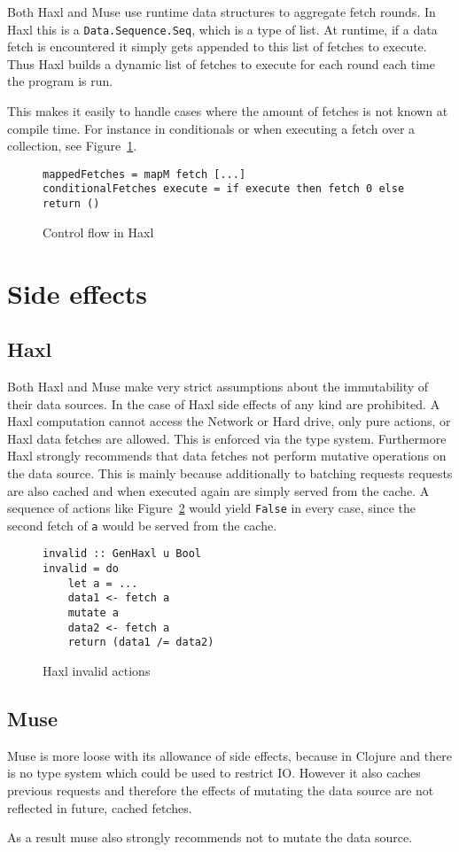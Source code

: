 Both Haxl and Muse use runtime data structures to aggregate fetch rounds.
In Haxl this is a \texttt{Data.Sequence.Seq}, which is a type of list.
At runtime, if a data fetch is encountered it simply gets appended to this list of fetches to execute.
Thus Haxl builds a dynamic list of fetches to execute for each round each time the program is run.

This makes it easily to handle cases where the amount of fetches is not known at compile time.
For instance in conditionals or when executing a fetch over a collection, see Figure~\ref{fig:control-flow-in-haxl}.

\begin{figure}
\begin{verbatim}
mappedFetches = mapM fetch [...]
conditionalFetches execute = if execute then fetch 0 else return ()
\end{verbatim}
\caption{Control flow in Haxl}
\label{fig:control-flow-in-haxl}
\end{figure}

\section{Side effects}

\subsection{Haxl}

Both Haxl and Muse make very strict assumptions about the immutability of their data sources.
In the case of Haxl side effects of any kind are prohibited.
A Haxl computation cannot access the Network or Hard drive, only pure actions, or Haxl data fetches are allowed.
This is enforced via the type system.
Furthermore Haxl strongly recommends that data fetches not perform mutative operations on the data source.
This is mainly because additionally to batching requests requests are also cached and when executed again are simply served from the cache.
A sequence of actions like Figure~\ref{fig:haxl-invalid-actions} would yield \texttt{False} in every case, since the second fetch of \texttt{a} would be served from the cache.

\begin{figure}
\begin{verbatim}
invalid :: GenHaxl u Bool
invalid = do
    let a = ...
    data1 <- fetch a
    mutate a
    data2 <- fetch a
    return (data1 /= data2)
\end{verbatim}
\caption{Haxl invalid actions}
\label{fig:haxl-invalid-actions}
\end{figure}

\subsection{Muse}

Muse is more loose with its allowance of side effects, because in Clojure and there is no type system which could be used to restrict IO.
However it also caches previous requests and therefore the effects of mutating the data source are not reflected in future, cached fetches.

As a result muse also strongly recommends not to mutate the data source.
